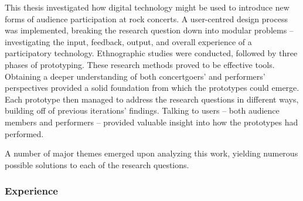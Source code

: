 
This thesis investigated how digital technology might be used to introduce new forms of audience participation at rock concerts. A user-centred design process was implemented, breaking the research question down into modular problems -- investigating the input, feedback, output, and overall experience of a participatory technology. Ethnographic studies were conducted, followed by three phases of prototyping. These research methods proved to be effective tools. Obtaining a deeper understanding of both concertgoers' and performers' perspectives provided a solid foundation from which the prototypes could emerge. Each prototype then managed to address the research questions in different ways, building off of previous iterations' findings. Talking to users -- both audience members and performers -- provided valuable insight into how the prototypes had performed.

A number of major themes emerged upon analyzing this work, yielding numerous possible solutions to each of the research questions.

\subsubsection{Experience}

